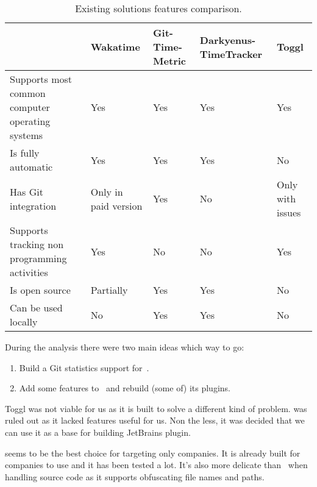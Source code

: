 \begin{table}[h]
    \centering
    \begin{tabular}{ | p{4cm} | p{2.25cm} | p{2.25cm} | p{2.25cm} | p{2.25cm} | }
        \hline
         & Wakatime & Git-Time-Metric & Darkyenus-TimeTracker & Toggl\\
        \hline
        Supports most common computer operating systems & Yes & Yes & Yes & Yes\\
        \hline
        Is fully automatic & Yes & Yes & Yes & No\\
        \hline
        Has Git integration & Only in paid version & Yes & No & Only with issues\\
        \hline
        Supports tracking non programming activities & Yes & No & No & Yes\\
        \hline
        Is open source & Partially & Yes & Yes & No\\
        \hline
        Can be used locally & No & Yes & Yes & No\\
        \hline
    \end{tabular}
    \caption{Existing solutions features comparison.}
    \label{tab:comparison-results}
\end{table}

During the analysis there were two main ideas which way to go:
\begin{enumerate}
    \item Build a Git statistics support for~.
    \item Add some features to~ and rebuild (some of) its plugins.
\end{enumerate}

Toggl was not viable for us as it is built to solve a different kind of problem.
 was ruled out as it lacked features useful for us.
Non the less, it was decided that we can use it as a base for building JetBrains plugin.

 seems to be the best choice for targeting only companies.
It is already built for companies to use and it has been tested a lot.
It's also more delicate than~ when handling source code as it supports obfuscating file names and paths.


